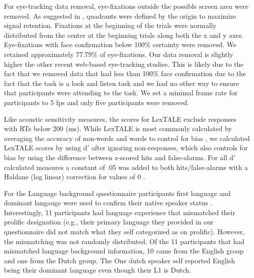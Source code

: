 For eye-tracking data removal, eye-fixations outside the possible screen area were removed. As suggested in \cite{AOW}, quadrants were defined by the origin to maximize signal retention. Fixations at the beginning of the trials were normally distributed from the center at the beginning trials along both the x and y axes. Eye-fixations with face confirmation below 100\% certainty were removed. We retained approximately 77.79\% of eye-fixations. Our data removal is slightly higher the other recent web-based eye-tracking studies. This is likely due to the fact that we removed data that had less than 100\% face confirmation due to the fact that the task is a look and listen task and we had no other way to ensure that participants were attending to the task. We set a minimal frame rate for participants to 5 fps \citep{Vos_2022} and only five participants were removed.

Like acoustic sensitivity measures, the scores for LexTALE exclude responses with RTs below 200 (ms). While LexTALE is most commonly calculated by averaging the accuracy of non-words and words to control for bias \citep{lemhofer2012introducing}, we calculated LexTALE scores by using d$'$ after ignoring non-responses, which also controls for bias by using the difference between z-scored hits and false-alarms. For all d$'$ calculated measures a constant of .05 was added to both hits/false-alarms with a Haldane (log linear) correction for values of 0 \citep{Hautus1995}. 

For the Language background questionnaire participants first language and dominant langauge were used to confirm their native speaker status \cite{Brown_Tusmagambet_Rahming_Tu_DeSalvo_Wiener_2023}.
Interestingly, 11 participants had language experience that mismatched their prolific designation (e.g., their primary language they provided in our questionnaire did not match what they self categorized as on prolific). However, the mismatching was not randomly distributed. Of the 11 participants that had mismatched language background information, 10 came from the English group and one from the Dutch group. The One dutch speaker self reported English being their dominant language even though their L1 is Dutch.

